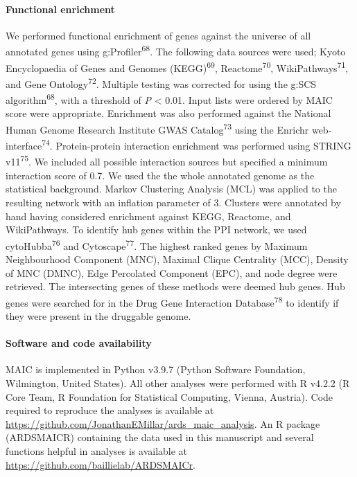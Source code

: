 \documentclass[
  11,
  a4paper,
]{article}
\let\oldparagraph\paragraph
\renewcommand{\paragraph}[1]{\oldparagraph{#1}\mbox{}}
\begin{document}
\hypertarget{functional-enrichment-1}{%
\paragraph{Functional enrichment}\label{functional-enrichment-1}}

We performed functional enrichment of genes against the universe of all
annotated genes using g:Profiler\textsuperscript{68}. The following data
sources were used; Kyoto Encyclopaedia of Genes and Genomes
(KEGG)\textsuperscript{69}, Reactome\textsuperscript{70},
WikiPathways\textsuperscript{71}, and Gene Ontology\textsuperscript{72}.
Multiple testing was corrected for using the g:SCS
algorithm\textsuperscript{68}, with a threshold of \emph{P} \textless{}
0.01. Input lists were ordered by MAIC score were appropriate.
Enrichment was also performed against the National Human Genome Research
Institute GWAS Catalog\textsuperscript{73} using the Enrichr
web-interface\textsuperscript{74}. Protein-protein interaction
enrichment was performed using STRING v11\textsuperscript{75}. We
included all possible interaction sources but specified a minimum
interaction score of 0.7. We used the the whole annotated genome as the
statistical background. Markov Clustering Analysis (MCL) was applied to
the resulting network with an inflation parameter of 3. Clusters were
annotated by hand having considered enrichment against KEGG, Reactome,
and WikiPathways. To identify hub genes within the PPI network, we used
cytoHubba\textsuperscript{76} and Cytoscape\textsuperscript{77}. The
highest ranked genes by Maximum Neighbourhood Component (MNC), Maximal
Clique Centrality (MCC), Density of MNC (DMNC), Edge Percolated
Component (EPC), and node degree were retrieved. The intersecting genes
of these methods were deemed hub genes. Hub genes were searched for in
the Drug Gene Interaction Database\textsuperscript{78} to identify if
they were present in the druggable genome.

\hypertarget{software-and-code-availability}{%
\paragraph{Software and code
availability}\label{software-and-code-availability}}

MAIC is implemented in Python v3.9.7 (Python Software Foundation,
Wilmington, United States). All other analyses were performed with R
v4.2.2 (R Core Team, R Foundation for Statistical Computing, Vienna,
Austria). Code required to reproduce the analyses is available at
\url{https://github.com/JonathanEMillar/ards_maic_analysis}. An R
package (ARDSMAICR) containing the data used in this manuscript and
several functions helpful in analyses is available at
\url{https://github.com/baillielab/ARDSMAICr}.
\end{document}
